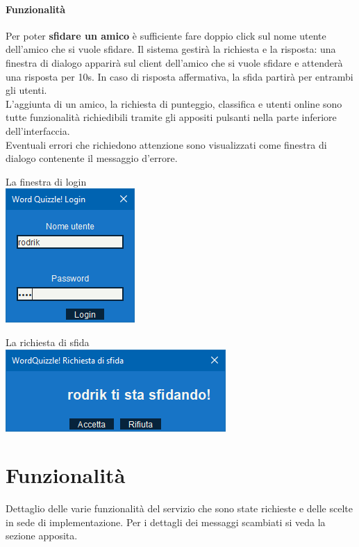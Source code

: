 \documentclass[10pt]{article}
\begin{document}
{\paragraph{Funzionalità} Per poter \textbf{sfidare un amico} è sufficiente fare doppio click sul nome utente dell'amico che si vuole sfidare. Il sistema gestirà la richiesta e la risposta: una finestra di dialogo apparirà sul client dell'amico che si vuole sfidare e attenderà una risposta per 10s. In caso di risposta affermativa, la sfida partirà per entrambi gli utenti.\\
L'aggiunta di un amico, la richiesta di punteggio, classifica e utenti online sono tutte funzionalità richiedibili tramite gli appositi pulsanti nella parte inferiore dell'interfaccia.\\
Eventuali errori che richiedono attenzione sono visualizzati come finestra di dialogo contenente il messaggio d'errore.
\begin{multicols}{2}
\begin{center}
La finestra di login\\
\includegraphics[scale=1]{login.png}
\end{center}
\begin{center}
La richiesta di sfida\\
\includegraphics[scale=1]{sfida.png}
\end{center}
\end{multicols}
\pagebreak
\section{Funzionalità}
Dettaglio delle varie funzionalità del servizio che sono state richieste e delle scelte in sede di implementazione. Per i dettagli dei messaggi scambiati si veda la sezione apposita.
}
\end{document}
